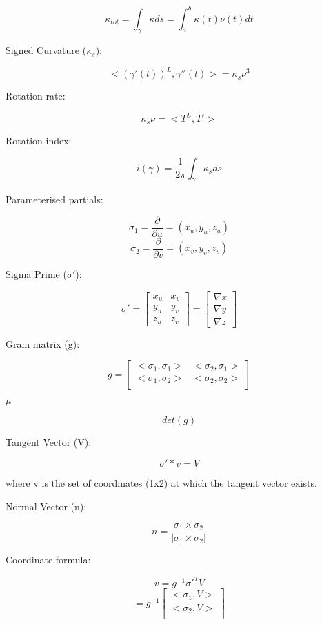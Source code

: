 \documentclass{article}
\begin{document}
 \[\kappa_{tot} =  \int_{\gamma} \kappa ds = \int_{a}^{b} \kappa(t) \nu(t) dt\]
 
 Signed Curvature ($\kappa_{s}$):
 
 \[<(\gamma'(t))^L,\gamma''(t)> = \kappa_{s}\nu^3\]
 
 Rotation rate:
 
 \[\kappa_{s} \nu = <T^L, T'> \]
 
 Rotation index:
 
 \[ i(\gamma) = \frac{1}{2\pi} \int_{\gamma} \kappa_{s} ds \]
 
 Parameterised partials:
 
 \[ \sigma_{1} = \frac{\partial}{\partial u} = (x_{u}, y_{u}, z_{u})\]
\[  \sigma_{2} = \frac{\partial}{\partial v} = (x_{v}, y_{v}, z_{v}) \]

Sigma Prime ($\sigma'$):

\[
  \sigma' =
  \begin{bmatrix}
x_{u} & x_{v} \\
y_{u} & y_{v} \\
z_{u} & z_{v}
\end{bmatrix}
=
\begin{bmatrix}
\nabla x \\
\nabla y \\
\nabla z
\end{bmatrix}
 \]
 
 Gram matrix (g):
 
 \[g =  \begin{bmatrix}
<\sigma_1, \sigma_1> & <\sigma_2, \sigma_1> \\
<\sigma_1, \sigma_2> & <\sigma_2, \sigma_2> \\
\end{bmatrix}\]

$\mu$

\[det(g)\]

Tangent Vector (V):

\[ \sigma' * v = V \]

where v is the set of coordinates (1x2) at which the tangent vector exists.

Normal Vector (n):

\[ n = \frac{\sigma_1 \times \sigma_2}{|\sigma_1 \times \sigma_2|}\]

Coordinate formula:

\[v = g^{-1}\sigma'^TV \]
\[ = g^{-1}
\begin{bmatrix}
<\sigma_1, V>\\
<\sigma_2, V>\\
\end{bmatrix}
\]
\end{document}
